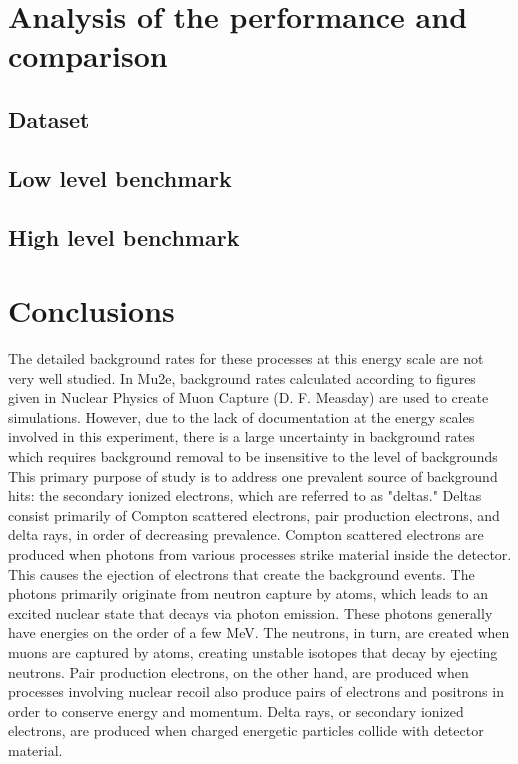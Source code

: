 \section{Analysis of the performance and comparison}
\subsection{Dataset}
\subsection{Low level benchmark}
\subsection{High level benchmark}

\section{Conclusions}
\iffalse

 The detailed background rates for these processes at this energy scale are not very
well studied. In Mu2e, background rates calculated according to figures given in Nuclear Physics of
Muon Capture (D. F. Measday) are used to create simulations. However, due to the lack of
documentation at the energy scales involved in this experiment, there is a large uncertainty in
background rates which requires background removal to be insensitive to the level of backgrounds
This primary purpose of study is to address one prevalent source of background hits: the
secondary ionized electrons, which are referred to as "deltas." Deltas consist primarily of Compton
scattered electrons, pair production electrons, and delta rays, in order of decreasing prevalence.
Compton scattered electrons are produced when photons from various processes strike material
inside the detector. This causes the ejection of electrons that create the background events. The
photons primarily originate from neutron capture by atoms, which leads to an excited nuclear state
that decays via photon emission. These photons generally have energies on the order of a few MeV.
The neutrons, in turn, are created when muons are captured by atoms, creating unstable isotopes that
decay by ejecting neutrons. Pair production electrons, on the other hand, are produced when
processes involving nuclear recoil also produce pairs of electrons and positrons in order to conserve
energy and momentum. Delta rays, or secondary ionized electrons, are produced when charged
energetic particles collide with detector material.






